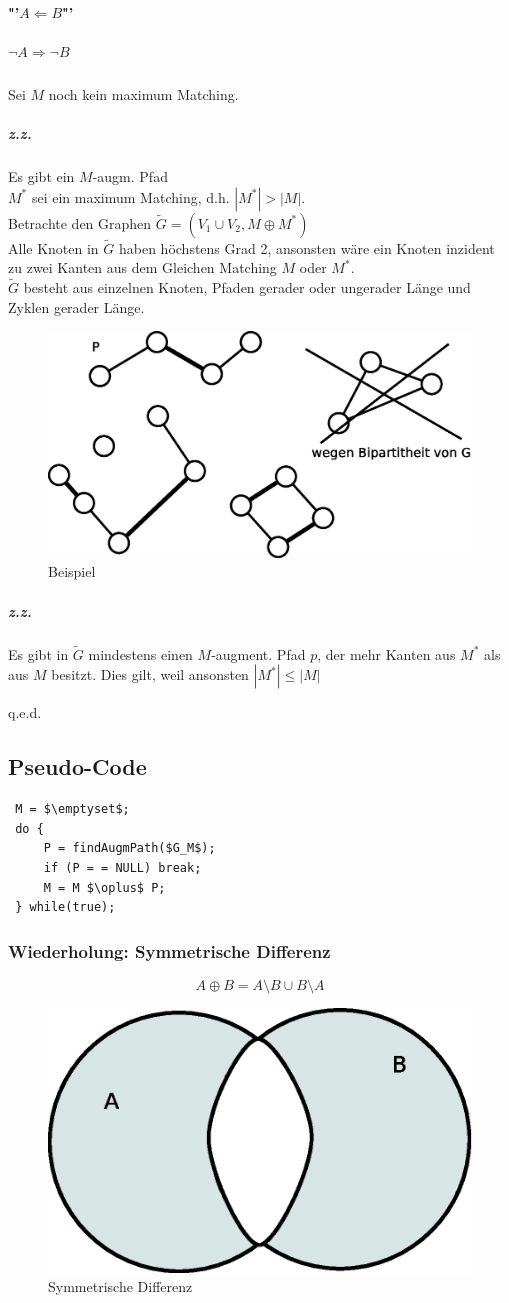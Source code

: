  \paragraph{"'$A\Leftarrow B$"'}
 \subparagraph{$\neg A \Rightarrow \neg B$}
 Sei $M$ noch kein maximum Matching.
 \subparagraph{z.z.} Es gibt ein $M$-augm. Pfad\\
 $M^*$ sei ein maximum Matching, d.h. $|M^*| > |M|$.\\
 Betrachte den Graphen $\tilde{G} = (V_1\cup V_2, M\oplus M^*)$\\
 Alle Knoten in $\tilde{G}$ haben höchstens Grad 2, ansonsten wäre ein Knoten inzident zu zwei Kanten aus dem Gleichen Matching $M$ oder $M^*$.\\
 $\tilde{G}$ besteht aus einzelnen Knoten, Pfaden gerader oder ungerader Länge und Zyklen gerader Länge.
 \begin{figure}[H]
\centering
\includegraphics[width=0.3\linewidth]{23/Grafik/Diagramm7}
\caption{Beispiel}
\label{fig:Diagramm7}
\end{figure}

 \subparagraph{z.z.} Es gibt in $\tilde{G}$ mindestens einen $M$-augment. Pfad $p$, der mehr Kanten aus $M^*$ als aus $M$ besitzt. Dies gilt, weil ansonsten $|M^*| \leq |M|$
 \begin{flushright}
 	q.e.d.
 \end{flushright}
 \subsection{Pseudo-Code}
 \begin{lstlisting}
 M = $\emptyset$;
 do {
	 P = findAugmPath($G_M$);
	 if (P = = NULL) break;
	 M = M $\oplus$ P;
 } while(true);
 \end{lstlisting}
 \subsubsection{Wiederholung: Symmetrische Differenz}
 \[ A\oplus B = A\setminus B \cup B \setminus A \]
 \begin{figure}[H]
\centering
\includegraphics[width=0.3\linewidth]{23/Grafik/Diagramm9}
\caption{Symmetrische Differenz}
\label{fig:Diagramm9}
\end{figure}

